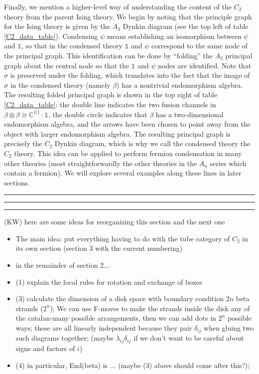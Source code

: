 \documentclass[12pt,a4paper]{article}
\newcounter{arrow}
\newcommand{\tp}{\otimes}
\newcommand{\unit}{\mathds{1}}
\newcommand{\cc}{\mathbb{C}}
\newcommand{\kw}[1]{{\color{kwcolor}\footnotesize{(KW) #1}}}
\newcommand{\kwsep}{\bigskip\hrule\medskip\hrule\medskip\hrule\bigskip}
\begin{document}
Finally, we mention a higher-level way of understanding the content of the $C_2$ theory from the
parent Ising theory. We begin by noting that the principle graph for the Ising theory 
is given by the $A_3$ Dynkin diagram (see the top left of table \ref{C2_data_table}). 
Condensing $\psi$ means establishing an isomorphism between $\psi$ and $\unit$, 
so that in the condensed theory $\unit$ and $\psi$ correspond to the same node of the 
principal graph. This identification can be done by ``folding'' the $A_3$ principal graph 
about the central node so that the $\unit$ and $\psi$ nodes are identified. 
Note that $\sigma$ is preserved under the folding, which translates into the fact that the 
image of $\sigma$ in the condensed theory (namely $\beta$) has a nontrivial endomorphism 
algebra. 
The resulting folded principal graph is shown in the top right of table \ref{C2_data_table}: the double 
line indicates the two fusion channels in $\beta\tp\beta \cong\cc^{1|1}\cdot \unit$, the 
double circle indicates that $\beta$ has a two-dimensional endomorphism algebra, and 
the arrows have been chosen to point away from the object with larger endomorphism 
algebra. The resulting principal graph is precisely the $C_2$ Dynkin diagram, 
which is why we call the condensed theory the $C_2$ theory. 
This idea can be applied to perform fermion condensation in many other theories (most straightforwardly 
the other theories in the $A_n$ series which contain a fermion). 
We will explore several examples along these lines in later sections. 

\kwsep

\kw{here are some ideas for reorganizing this section and the next one}

\begin{itemize}
\item The main idea: put everything having to do with the tube category of $C_2$ in its own section (section 3 with
the current numbering)
\item in the remainder of section 2...
\item (1) explain the local rules for rotation and exchange of boxes
\item (3) calculate the dimension of a disk space with boundary condition $2n$ beta strands ($2^n$);
We can use F-moves to make the strands inside the disk any of the catalan-many possible arrangements, 
then we can add dots in $2^n$ possible ways; these are all linearly independent because they pair $\delta_{ij}$
when gluing two such diagrams together; (maybe $\lambda_{ij}\delta_{ij}$ if we don't want to 
be careful about signs and factors of $i$)
\item (4) in particular, End(beta) is ... (maybe (3) above should come after this?); 
\end{itemize}
\end{document}
